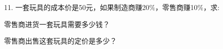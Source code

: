 11.	一套玩具的成本价是50元，如果制造商赚20$\%$，零售商赚10$\%$，求:

\begin{subquestions}

    \subquestion 零售商进货一套玩具需要多少钱？

    \subquestion 零售商出售这套玩具的定价是多少？    

\end{subquestions}





